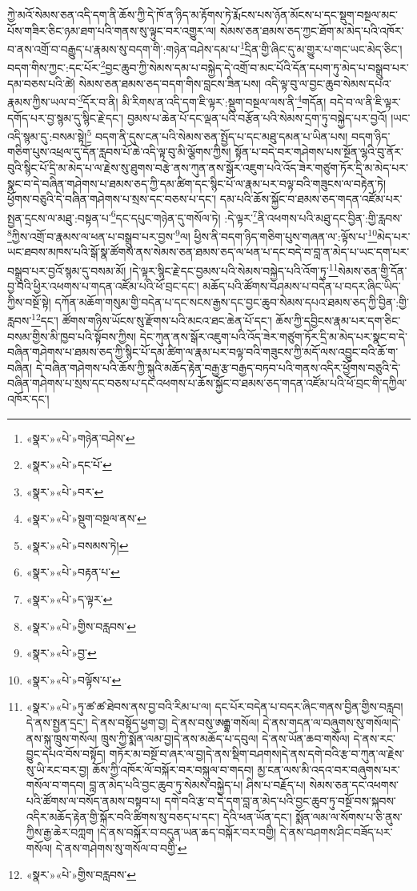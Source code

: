 ཀྱེ་མའོ་སེམས་ཅན་འདི་དག་ནི་ཆོས་ཀྱི་དེ་ཁོ་ན་ཉིད་མ་རྟོགས་ཏེ་རྨོངས་པས་ཉོན་མོངས་པ་དང་སྡུག་བསྔལ་མང་པོས་གཟིར་ཅིང་ཉམ་ཐག་པའི་གནས་སུ་ལྟུང་བར་འགྱུར་ལ། སེམས་ཅན་ཐམས་ཅད་ཀྱང་ཐོག་མ་མེད་པའི་འཁོར་བ་ནས་འགྲོ་བ་བརྒྱུད་པ་རྣམས་སུ་བདག་གི་:གཉེན་བཤེས་དམ་པ་\footnote{«སྣར་»«པེ་»གཉེན་བཤེས་}དྲིན་གྱི་ཞིང་དུ་མ་གྱུར་པ་གང་ཡང་མེད་ཅིང་། བདག་གིས་ཀྱང་:དང་པོར་\footnote{«སྣར་»«པེ་»དང་པོ་}བྱང་ཆུབ་ཀྱི་སེམས་དམ་པ་བསྐྱེད་དེ་འགྲོ་བ་མང་པོའི་དོན་དཔག་ཏུ་མེད་པ་བསྒྲུབ་པར་དམ་བཅས་པའི་ཚེ། སེམས་ཅན་ཐམས་ཅད་བདག་གིས་བླངས་ཟིན་པས། འདི་ལྟ་བུ་ལ་བྱང་ཆུབ་སེམས་དཔའ་རྣམས་ཀྱིས་ཡལ་བ་\footnote{«སྣར་»«པེ་»བར་}དོར་བ་ནི། མི་རིགས་ན་འདི་དག་ཇི་ལྟར་:སྡུག་བསྔལ་ལས་ནི་\footnote{«སྣར་»«པེ་»སྡུག་བསྔལ་ནས་}གདོན། བདེ་བ་ལ་ནི་ཇི་ལྟར་དགོད་པར་བྱ་སྙམ་དུ་སྙིང་རྗེ་དང་། བྱམས་པ་ཆེན་པོ་དང་ལྡན་པའི་བརྩོན་པའི་སེམས་དྲག་ཏུ་བསྐྱེད་པར་བྱའོ། །ཡང་འདི་སྙམ་དུ་:བསམ་སྟེ།\footnote{«སྣར་»«པེ་»བསམས་ཏེ།} བདག་ནི་དུས་ངན་པའི་སེམས་ཅན་སྤྱོད་པ་དང་མཐུ་དམན་པ་ཡིན་པས། བདག་ཉིད་གཅིག་པུས་འཕྲལ་དུ་དོན་རླབས་པོ་ཆེ་འདི་ལྟ་བུ་མི་ལྕོགས་ཀྱིས། སྟོན་པ་བདེ་བར་གཤེགས་པས་སྔོན་ལྷའི་བུ་ནོར་བུའི་སྙིང་པོ་དྲི་མ་མེད་པ་ལ་རྗེས་སུ་ཐུགས་བརྩེ་ནས་ཀུན་ནས་སྒོར་འཇུག་པའི་འོད་ཟེར་གཙུག་ཏོར་དྲི་མ་མེད་པར་སྣང་བ་དེ་བཞིན་གཤེགས་པ་ཐམས་ཅད་ཀྱི་དམ་ཚིག་དང་སྙིང་པོ་ལ་རྣམ་པར་བལྟ་བའི་གཟུངས་ལ་བརྟེན་ཏེ། ཕྱོགས་བཅུའི་དེ་བཞིན་གཤེགས་པ་སྲས་དང་བཅས་པ་དང་། དམ་པའི་ཆོས་སྐྱོང་བ་ཐམས་ཅད་གདན་འཛོམ་པར་སྤྱན་དྲངས་ལ་མཐུ་:བསྟན་པ་\footnote{«སྣར་»«པེ་»བརྟན་པ་}དང་དཔུང་གཉེན་དུ་གསོལ་ཏེ། :དེ་ལྟར་\footnote{«སྣར་»«པེ་»ད་ལྟར་}ནི་འཕགས་པའི་མཐུ་དང་བྱིན་:གྱི་རླབས་\footnote{«སྣར་»«པེ་»གྱིས་བརླབས་}ཀྱིས་འགྲོ་བ་རྣམས་ལ་ཕན་པ་བསྒྲུབ་པར་བྱས་\footnote{«སྣར་»«པེ་»བྱ་}ལ། ཕྱིས་ནི་བདག་ཉིད་གཅིག་པུས་གཞན་ལ་:ལྟོས་པ་\footnote{«སྣར་»«པེ་»བལྟོས་པ་}མེད་པར་ཡང་ཐབས་མཁས་པའི་སྒོ་སྣ་ཚོགས་ནས་སེམས་ཅན་ཐམས་ཅད་ལ་ཕན་པ་དང་བདེ་བ་བླ་ན་མེད་པ་ཡང་དག་པར་བསྒྲུབ་པར་བྱའོ་སྙམ་དུ་བསམ་མོ། །དེ་ལྟར་སྙིང་རྗེ་དང་བྱམས་པའི་སེམས་བསྐྱེད་པའི་འོག་ཏུ་\footnote{«སྣར་»«པེ་»ཏུ་ཚ་ཚ་ཐེབས་ནས་བྱ་བའི་རིམ་པ་ལ། དང་པོར་བདེན་པ་བདར་ཞིང་གནས་བྱིན་གྱིས་བརླབ། དེ་ནས་སྤྱན་དྲང་། དེ་ནས་བསྟོད་ཕྱག་བྱ། དེ་ནས་བསུ་ཨརྒྷ་གསོལ། དེ་ནས་གདན་ལ་བཞུགས་སུ་གསོལ།དེ་ནས་སྐུ་ཁྲུས་གསོལ། ཁྲུས་ཀྱི་སྨོན་ལམ་བྱ།དེ་ནས་མཆོད་པ་དབུལ། དེ་ནས་ཡོན་ཆབ་གསོལ། དེ་ནས་རང་བྱུང་དཔའ་བོས་བསྟོད། གཏོར་མ་བསྔོ་བ་ཞར་ལ་བྱ།དེ་ནས་སྡིག་བཤགས།དེ་ནས་དགེ་བའི་རྩ་བ་ཀུན་ལ་རྗེས་སུ་ཡི་རང་བར་བྱ། ཆོས་ཀྱི་འཁོར་ལོ་བསྐོར་བར་བསྐུལ་བ་གདབ། མྱ་ངན་ལས་མི་འདའ་བར་བཞུགས་པར་གསོལ་བ་གདབ། བླ་ན་མེད་པའི་བྱང་ཆུབ་ཏུ་སེམས་བསྐྱེད་པ། ཤིས་པ་བརྗོད་པ། སེམས་ཅན་དང་འཕགས་པའི་ཚོགས་ལ་བསོད་ནམས་བསྟབ་པ། དགེ་བའི་རྩ་བ་དེ་དག་བླ་ན་མེད་པའི་བྱང་ཆུབ་ཏུ་བསྔོ་བས་སྐབས་འདིར་མཆོད་རྟེན་གྱི་སྐོར་བའི་ཚིགས་སུ་བཅད་པ་དང་། དེའི་ཕན་ཡོན་དང་། སྨོན་ལམ་ལ་སོགས་པ་ཅི་ནུས་ཀྱིས་རྒྱ་ཆེར་བཀླག །དེ་ནས་བསྐོར་བ་བདུན་ཡན་ཆད་བསྐོར་བར་བགྱི། དེ་ནས་བཤགས་ཤིང་བཟོད་པར་གསོལ། དེ་ནས་གཤེགས་སུ་གསོལ་བ་བགྱི་}སེམས་ཅན་གྱི་དོན་བྱ་བའི་ཕྱིར་འཕགས་པ་གདན་འཛོམ་པའི་ཕོ་བྲང་དང་། མཆོད་པའི་ཚོགས་བཤམས་པ་བདེན་པ་བདར་ཞིང་ཡིད་ཀྱིས་བསྔོ་སྟེ། དཀོན་མཆོག་གསུམ་གྱི་བདེན་པ་དང་སངས་རྒྱས་དང་བྱང་ཆུབ་སེམས་དཔའ་ཐམས་ཅད་ཀྱི་བྱིན་:གྱི་རླབས་\footnote{«སྣར་»«པེ་»གྱིས་བརླབས་}དང་། ཚོགས་གཉིས་ཡོངས་སུ་རྫོགས་པའི་མངའ་ཐང་ཆེན་པོ་དང་། ཆོས་ཀྱི་དབྱིངས་རྣམ་པར་དག་ཅིང་བསམ་གྱིས་མི་ཁྱབ་པའི་སྟོབས་ཀྱིས། དེང་ཀུན་ནས་སྒོར་འཇུག་པའི་འོད་ཟེར་གཙུག་ཏོར་དྲི་མ་མེད་པར་སྣང་བ་དེ་བཞིན་གཤེགས་པ་ཐམས་ཅད་ཀྱི་སྙིང་པོ་དམ་ཚིག་ལ་རྣམ་པར་བལྟ་བའི་གཟུངས་ཀྱི་མདོ་ལས་འབྱུང་བའི་ཆོ་ག་བཞིན། དེ་བཞིན་གཤེགས་པའི་ཆོས་ཀྱི་སྐུའི་མཆོད་རྟེན་བརྒྱ་རྩ་བརྒྱད་བཏབ་པའི་གནས་འདིར་ཕྱོགས་བཅུའི་དེ་བཞིན་གཤེགས་པ་སྲས་དང་བཅས་པ་དང་འཕགས་པ་ཆོས་སྐྱོང་བ་ཐམས་ཅད་གདན་འཛོམ་པའི་ཕོ་བྲང་གི་དཀྱིལ་འཁོར་དང་། 